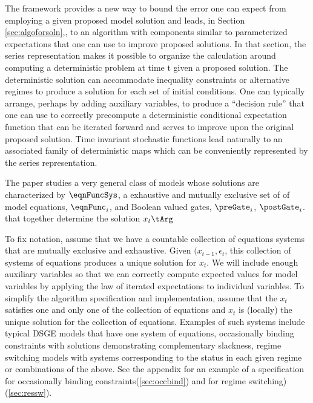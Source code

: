 \documentclass[12pt]{article}
\begin{document}
The framework provides a new way to bound the error one can expect from
employing a given proposed model solution and leads, in Section \ref{sec:algoforsoln},, to an
algorithm with  components similar to parameterized expectations that
one can use to improve proposed solutions. In that section, the
series representation makes
it possible to organize the calculation around computing a deterministic
problem at time t given a proposed solution.  The deterministic solution
can accommodate inequality constraints or alternative regimes to produce a
solution for each set of initial conditions.  One can typically arrange,
perhaps by adding auxiliary variables, to produce a ``decision rule''
that one can use to correctly precompute a deterministic conditional
expectation function that can be iterated forward and serves to
improve upon the original proposed solution.
Time invariant stochastic functions 
lead naturally to an associated family of deterministic maps
which can be conveniently represented by the series representation.


The paper studies a very general class of models whose 
solutions are characterized by $\eqnFuncSys$, a 
 exhaustive and mutually exclusive set of
of   model equations, $\eqnFunc_i$,  and Boolean valued gates, $\preGate_i$, $\postGate_i$. 
that together determine the solution  $x_t\tArg$




To fix notation,  assume that we have a countable collection of equations systems that are mutually exclusive and exhaustive.
Given $(x_{t-1},\epsilon_t$,  this collection of 
systems of equations produces a unique solution for $x_t$.  We will include 
enough auxiliary variables so that we can correctly compute expected values
for model variables by applying the law of iterated 
expectations to individual variables.
To simplify the algorithm specification and implementation, assume that the
$x_t$ satisfies one and only one of the 
collection of equations and $x_t$ is (locally) the unique solution 
for the collection of
equations.  Examples of such systems include typical DSGE models that have one
system of equations, occasionally binding constraints with solutions demonstrating complementary slackness, regime switching models with systems corresponding to the status in each given regime or combinations of the above.  See the appendix for an example of a specification for occasionally binding constraints(\ref{sec:occbind}) and for regime switching)(\ref{sec:ressw}).
\end{document}
